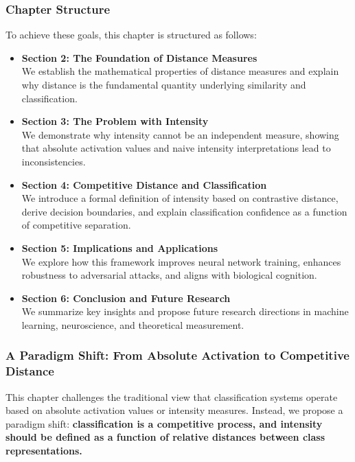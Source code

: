 \documentclass[12pt]{article}
\begin{document}
\subsubsection{Chapter Structure}

To achieve these goals, this chapter is structured as follows:

\begin{itemize}
    \item \textbf{Section 2: The Foundation of Distance Measures} \\
    We establish the mathematical properties of distance measures and explain why distance is the fundamental quantity underlying similarity and classification.
    \item \textbf{Section 3: The Problem with Intensity} \\
    We demonstrate why intensity cannot be an independent measure, showing that absolute activation values and naive intensity interpretations lead to inconsistencies.
    \item \textbf{Section 4: Competitive Distance and Classification} \\
    We introduce a formal definition of intensity based on contrastive distance, derive decision boundaries, and explain classification confidence as a function of competitive separation.
    \item \textbf{Section 5: Implications and Applications} \\
    We explore how this framework improves neural network training, enhances robustness to adversarial attacks, and aligns with biological cognition.
    \item \textbf{Section 6: Conclusion and Future Research} \\
    We summarize key insights and propose future research directions in machine learning, neuroscience, and theoretical measurement.
\end{itemize}

\subsubsection{A Paradigm Shift: From Absolute Activation to Competitive Distance}

This chapter challenges the traditional view that classification systems operate based on absolute activation values or intensity measures. Instead, we propose a paradigm shift: \textbf{classification is a competitive process, and intensity should be defined as a function of relative distances between class representations.}
\end{document}

